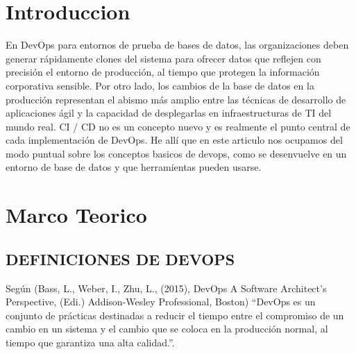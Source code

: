 \documentclass[preprint,12pt]{elsarticle}
\begin{document}
\section{Introduccion}
En DevOps para entornos de prueba de bases de datos, las organizaciones deben generar rápidamente clones del sistema para ofrecer datos que reflejen con precisión el entorno de producción, al tiempo que protegen la información corporativa sensible. Por otro lado, los cambios de la base de datos en la producción representan el abismo más amplio entre las técnicas de desarrollo de aplicaciones ágil y la capacidad de desplegarlas en infraestructuras de TI del mundo real.
CI / CD no es un concepto nuevo y es realmente el punto central de cada implementación de DevOps. He allí que en este articulo nos ocupamos del modo puntual sobre los conceptos basicos de devops, como se desenvuelve en un entorno de base de datos y que herramientas pueden usarse.

	
\section{Marco Teorico}
	
\subsection{DEFINICIONES DE DEVOPS}	

Según (Bass, L., Weber, I., Zhu, L., (2015), DevOps A Software Architect’s Perspective, (Edi.) Addison-Wesley Professional, Boston) “DevOps es un conjunto de prácticas destinadas a reducir el tiempo entre el compromiso de un cambio en un sistema y el cambio que se coloca en la producción normal, al tiempo que garantiza una alta calidad.”.
\end{document}
